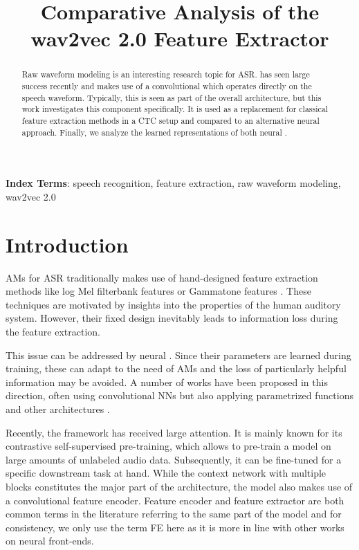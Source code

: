 \documentclass{INTERSPEECH2023}
\title{Comparative Analysis of the wav2vec 2.0 Feature Extractor}
\begin{document}
\maketitle
 
\begin{abstract}
Raw waveform modeling is an interesting research topic for \gls{ASR}.
\wvtwo has seen large success recently and makes use of a convolutional \fe which operates directly on the speech waveform.
Typically, this \fe is seen as part of the overall architecture, but this work investigates this component specifically.
It is used as a replacement for classical feature extraction methods in a \gls{CTC} setup and compared to an alternative neural \fe approach.
Finally, we analyze the learned representations of both neural \fes.
\end{abstract}
\noindent\textbf{Index Terms}: speech recognition, feature extraction, raw waveform modeling, wav2vec 2.0

\glsresetall

\section{Introduction}
\glspl{AM} for \gls{ASR} traditionally makes use of hand-designed feature extraction methods like log Mel filterbank features or Gammatone features \cite{schlueter:icassp07}.
These techniques are motivated by insights into the properties of the human auditory system.
However, their fixed design inevitably leads to information loss during the feature extraction.

This issue can be addressed by neural \fes.
Since their parameters are learned during training, these \fes can adapt to the need of \glspl{AM} and the loss of particularly helpful information may be avoided.
A number of works have been proposed in this direction, often using convolutional \glspl{NN} \cite{palaz2015convolutional, golik15:cnn, tuske2018:waveform} but also applying parametrized functions \cite{ravanelli2018sincnet} and other architectures \cite{sainath2015cldnn}.

Recently, the \wvtwo framework \cite{facebook2020wav2vec2} has received large attention.
It is mainly known for its contrastive self-supervised pre-training, which allows to pre-train a model on large amounts of unlabeled audio data.
Subsequently, it can be fine-tuned for a specific downstream task at hand.
While the context network with multiple \transformer blocks constitutes the major part of the architecture, the \wvtwo model also makes use of a convolutional feature encoder.
Feature encoder \cite{facebook2020wav2vec2, facebook2020xlsr} and feature extractor \cite{asapp2022performance, vyas2022ondemand} are both common terms in the literature referring to the same part of the model and for consistency, we only use the term \acrfull{FE} here as it is more in line with other works on neural front-ends.
\end{document}
